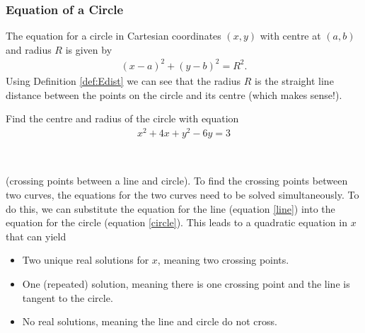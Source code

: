 \subsubsection{Equation of a Circle}

The equation for a circle in Cartesian coordinates $(x,y)$ with centre at $(a,b)$ and radius $R$ is given by
\begin{align}
    \label{circle} (x - a)^2 + (y-b)^2 = R^2.
\end{align}
Using Definition \ref{def:Edist} we can see that the radius $R$ is the straight line distance between the points on the circle and its centre (which makes sense!).\\ %

\begin{example}
    Find the centre and radius of the circle with equation
    \begin{align*}
        x^2 + 4x + y^2 - 6y = 3
    \end{align*}
\end{example}
\\

\begin{definition}
    (crossing points between a line and circle). To find the crossing points between two curves, the equations for the two curves need to be solved simultaneously. To do this, we can substitute the equation for the line (equation \eqref{line}) into the equation for the circle (equation \eqref{circle}). This leads to a quadratic equation in $x$ that can yield
    \begin{itemize}
        \item Two unique real solutions for $x$, meaning two crossing points.
        \item One (repeated) solution, meaning there is one crossing point and the line is tangent to the circle.
        \item No real solutions, meaning the line and circle do not cross.
    \end{itemize}
\end{definition}

